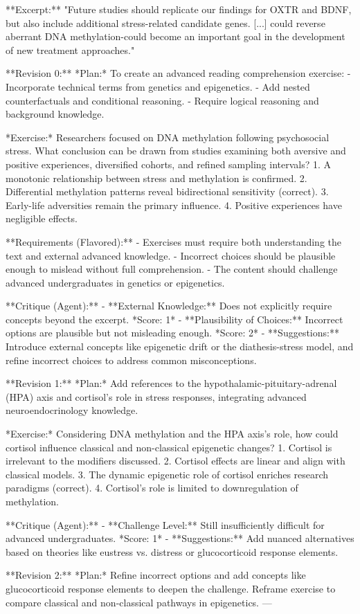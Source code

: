 \documentclass[11pt]{article}
\begin{document}
\begin{HighlightVerbatim}
**Excerpt:** 
"Future studies should replicate our findings for OXTR and BDNF, but also include additional stress-related candidate genes. [...] could reverse aberrant DNA methylation-could become an important goal in the development of new treatment approaches."

**Revision 0:**
*Plan:* To create an advanced reading comprehension exercise:
- Incorporate technical terms from genetics and epigenetics.
- Add nested counterfactuals and conditional reasoning.
- Require logical reasoning and background knowledge.

*Exercise:* Researchers focused on DNA methylation following psychosocial stress. What conclusion can be drawn from studies examining both aversive and positive experiences, diversified cohorts, and refined sampling intervals?
1. A monotonic relationship between stress and methylation is confirmed.
2. Differential methylation patterns reveal bidirectional sensitivity (correct).
3. Early-life adversities remain the primary influence.
4. Positive experiences have negligible effects.

**Requirements (Flavored):**
- Exercises must require both understanding the text and external advanced knowledge.
- Incorrect choices should be plausible enough to mislead without full comprehension.
- The content should challenge advanced undergraduates in genetics or epigenetics.

**Critique (Agent):**
- **External Knowledge:** Does not explicitly require concepts beyond the excerpt. *Score: 1*
- **Plausibility of Choices:** Incorrect options are plausible but not misleading enough. *Score: 2*
- **Suggestions:** Introduce external concepts like epigenetic drift or the diathesis-stress model, and refine incorrect choices to address common misconceptions.

**Revision 1:**
*Plan:* Add references to the hypothalamic-pituitary-adrenal (HPA) axis and cortisol's role in stress responses, integrating advanced neuroendocrinology knowledge.

*Exercise:* Considering DNA methylation and the HPA axis's role, how could cortisol influence classical and non-classical epigenetic changes?
1. Cortisol is irrelevant to the modifiers discussed.
2. Cortisol effects are linear and align with classical models.
3. The dynamic epigenetic role of cortisol enriches research paradigms (correct).
4. Cortisol’s role is limited to downregulation of methylation.

**Critique (Agent):**
- **Challenge Level:** Still insufficiently difficult for advanced undergraduates. *Score: 1*
- **Suggestions:** Add nuanced alternatives based on theories like eustress vs. distress or glucocorticoid response elements.

**Revision 2:**
*Plan:* Refine incorrect options and add concepts like glucocorticoid response elements to deepen the challenge. Reframe exercise to compare classical and non-classical pathways in epigenetics.
---
\end{HighlightVerbatim}
\end{document}
